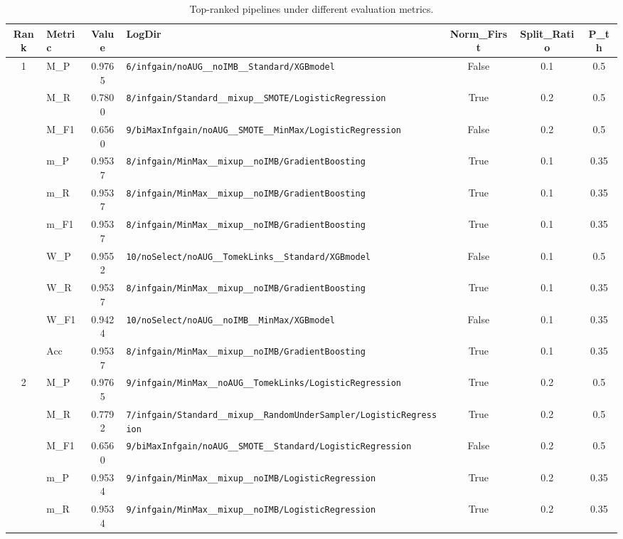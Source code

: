 \begin{table}[htbp]
\caption{Top-ranked pipelines under different evaluation metrics.}
\label{tab:rank_metric_vertical}
\centering
\small
\setlength{\tabcolsep}{4pt}
\begin{tabular}{|c|l|c|>{\ttfamily\footnotesize}p{7.2cm}|c|c|c|}
\hline
Rank & Metric & Value & LogDir & Norm\_First & Split\_Ratio & P\_th \\
\hline
\multirow{10}{*}{1} & M\_P & 0.9765 & \texttt{6/infgain/noAUG\_\_noIMB\_\_Standard/XGBmodel} & False & 0.1 & 0.5 \\
 & M\_R & 0.7800 & \texttt{8/infgain/Standard\_\_mixup\_\_SMOTE/LogisticRegression} & True & 0.2 & 0.5 \\
 & M\_F1 & 0.6560 & \texttt{9/biMaxInfgain/noAUG\_\_SMOTE\_\_MinMax/LogisticRegression} & False & 0.2 & 0.5 \\
 & m\_P & 0.9537 & \texttt{8/infgain/MinMax\_\_mixup\_\_noIMB/GradientBoosting} & True & 0.1 & 0.35 \\
 & m\_R & 0.9537 & \texttt{8/infgain/MinMax\_\_mixup\_\_noIMB/GradientBoosting} & True & 0.1 & 0.35 \\
 & m\_F1 & 0.9537 & \texttt{8/infgain/MinMax\_\_mixup\_\_noIMB/GradientBoosting} & True & 0.1 & 0.35 \\
 & W\_P & 0.9552 & \texttt{10/noSelect/noAUG\_\_TomekLinks\_\_Standard/XGBmodel} & False & 0.1 & 0.5 \\
 & W\_R & 0.9537 & \texttt{8/infgain/MinMax\_\_mixup\_\_noIMB/GradientBoosting} & True & 0.1 & 0.35 \\
 & W\_F1 & 0.9424 & \texttt{10/noSelect/noAUG\_\_noIMB\_\_MinMax/XGBmodel} & False & 0.1 & 0.35 \\
 & Acc & 0.9537 & \texttt{8/infgain/MinMax\_\_mixup\_\_noIMB/GradientBoosting} & True & 0.1 & 0.35 \\
\hline
\multirow{10}{*}{2} & M\_P & 0.9765 & \texttt{9/infgain/MinMax\_\_noAUG\_\_TomekLinks/LogisticRegression} & True & 0.2 & 0.5 \\
 & M\_R & 0.7792 & \texttt{7/infgain/Standard\_\_mixup\_\_RandomUnderSampler/LogisticRegression} & True & 0.2 & 0.5 \\
 & M\_F1 & 0.6560 & \texttt{9/biMaxInfgain/noAUG\_\_SMOTE\_\_Standard/LogisticRegression} & False & 0.2 & 0.5 \\
 & m\_P & 0.9534 & \texttt{9/infgain/MinMax\_\_mixup\_\_noIMB/LogisticRegression} & True & 0.2 & 0.35 \\
 & m\_R & 0.9534 & \texttt{9/infgain/MinMax\_\_mixup\_\_noIMB/LogisticRegression} & True & 0.2 & 0.35 \\

\end{tabular}
\end{table}
